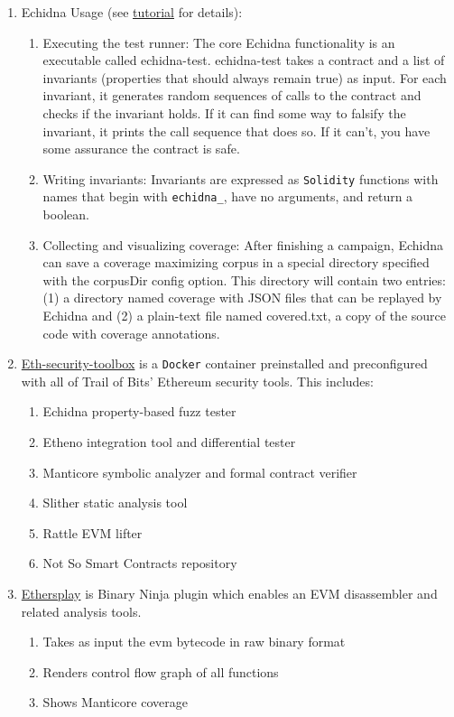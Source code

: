 \begin{enumerate}
\item Echidna Usage (see \href{https://github.com/crytic/building-secure-contracts/tree/master/program-analysis/echidna\#echidna-tutorial}{tutorial} for details):
	\begin{enumerate}
	\item Executing the test runner: The core Echidna functionality is an executable called echidna-test. echidna-test takes a contract and a list of invariants (properties that should always remain true) as input. For each invariant, it generates random sequences of calls to the contract and checks if the invariant holds. If it can find some way to falsify the invariant, it prints the call sequence that does so. If it can't, you have some assurance the contract is safe.
	\item Writing invariants: Invariants are expressed as \verb|Solidity| functions with names that begin with \verb|echidna_|, have no arguments, and return a boolean.
	\item Collecting and visualizing coverage: After finishing a campaign, Echidna can save a coverage maximizing corpus in a special directory specified with the corpusDir config option. This directory will contain two entries: (1) a directory named coverage with JSON files that can be replayed by Echidna and (2) a plain-text file named covered.txt, a copy of the source code with coverage annotations.
	\end{enumerate}

\item\href{https://github.com/crytic/eth-security-toolbox}{Eth-security-toolbox} is a \verb|Docker| container preinstalled and preconfigured with all of Trail of Bits’ Ethereum security tools. This includes:
	\begin{enumerate}
	\item Echidna property-based fuzz tester
	\item Etheno integration tool and differential tester
	\item Manticore symbolic analyzer and formal contract verifier
	\item Slither static analysis tool
	\item Rattle EVM lifter
	\item Not So Smart Contracts repository
	\end{enumerate}

\item\href{https://github.com/crytic/ethersplay}{Ethersplay} is Binary Ninja plugin which enables an EVM disassembler and related analysis tools.
	\begin{enumerate}
	\item Takes as input the evm bytecode in raw binary format
	\item Renders control flow graph of all functions
	\item Shows Manticore coverage
	\end{enumerate}


\end{enumerate}
